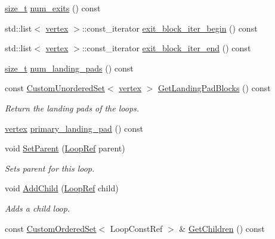 \begin{DoxyCompactItemize}
\hyperlink{tutorial__fpt__2017_2intro_2sixth_2test_8c_a7c94ea6f8948649f8d181ae55911eeaf}{size\+\_\+t} \hyperlink{classLoop_afbbd557703452bcebd167cf707759d51}{num\+\_\+exits} () const
\item 
std\+::list$<$ \hyperlink{graph_8hpp_abefdcf0544e601805af44eca032cca14}{vertex} $>$\+::const\+\_\+iterator \hyperlink{classLoop_ad472be2d5c670602f94e9bf7aba4e814}{exit\+\_\+block\+\_\+iter\+\_\+begin} () const
\item 
std\+::list$<$ \hyperlink{graph_8hpp_abefdcf0544e601805af44eca032cca14}{vertex} $>$\+::const\+\_\+iterator \hyperlink{classLoop_a73fe5bd00a5cb93a52e6dcb3bc85b03d}{exit\+\_\+block\+\_\+iter\+\_\+end} () const
\item 
\hyperlink{tutorial__fpt__2017_2intro_2sixth_2test_8c_a7c94ea6f8948649f8d181ae55911eeaf}{size\+\_\+t} \hyperlink{classLoop_a9c0d7e7c5da776ce054653d85a9d8912}{num\+\_\+landing\+\_\+pads} () const
\item 
const \hyperlink{classCustomUnorderedSet}{Custom\+Unordered\+Set}$<$ \hyperlink{graph_8hpp_abefdcf0544e601805af44eca032cca14}{vertex} $>$ \hyperlink{classLoop_a36c29ca47492fb97f4c2c64640a5ca4e}{Get\+Landing\+Pad\+Blocks} () const
\begin{DoxyCompactList}\small\item\em Return the landing pads of the loops. \end{DoxyCompactList}\item 
\hyperlink{graph_8hpp_abefdcf0544e601805af44eca032cca14}{vertex} \hyperlink{classLoop_add98cb2caef83ae9731be70e45689607}{primary\+\_\+landing\+\_\+pad} () const
\item 
void \hyperlink{classLoop_aa25e6e6fd579f595143557de8d61f37e}{Set\+Parent} (\hyperlink{loop_8hpp_aa4a60313089619376f67557c4120423c}{Loop\+Ref} parent)
\begin{DoxyCompactList}\small\item\em Sets parent for this loop. \end{DoxyCompactList}\item 
void \hyperlink{classLoop_a99c31028564545c39746c258e8ffbee7}{Add\+Child} (\hyperlink{loop_8hpp_aa4a60313089619376f67557c4120423c}{Loop\+Ref} child)
\begin{DoxyCompactList}\small\item\em Adds a child loop. \end{DoxyCompactList}\item 
const \hyperlink{classCustomOrderedSet}{Custom\+Ordered\+Set}$<$ Loop\+Const\+Ref $>$ \& \hyperlink{classLoop_ad95fae3f5f83c509c9d3a35b471ccf97}{Get\+Children} () const

\end{DoxyCompactItemize}
